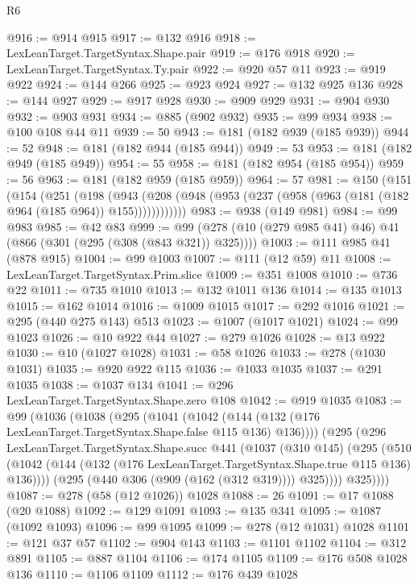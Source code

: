 \begin{lexlean}{R6}
\begin{coremodule}
{{{{{{{{{{{{{{{{{{{{{{{{{{{{{{{{{{{{{{{{{{{{{{{{{{@916 := @914 @915
@917 := @132 @916
@918 := LexLeanTarget.TargetSyntax.Shape.pair
@919 := @176 @918
@920 := LexLeanTarget.TargetSyntax.Ty.pair
@922 := @920 @57 @11
@923 := @919 @922
@924 := @144 @266
@925 := @923 @924
@927 := @132 @925 @136
@928 := @144 @927
@929 := @917 @928
@930 := @909 @929
@931 := @904 @930
@932 := @903 @931
@934 := @885 (@902 @932)
@935 := @99 @934
@938 := @100 @108 @44 @11
@939 := 50
@943 := @181 (@182 @939 (@185 @939))
@944 := 52
@948 := @181 (@182 @944 (@185 @944))
@949 := 53
@953 := @181 (@182 @949 (@185 @949))
@954 := 55
@958 := @181 (@182 @954 (@185 @954))
@959 := 56
@963 := @181 (@182 @959 (@185 @959))
@964 := 57
@981 := @150
    (@151
      (@154
        (@251
          (@198
            (@943 (@208 (@948 (@953 (@237 (@958 (@963 (@181 (@182 @964 (@185 @964)) @155))))))))))))
@983 := @938 (@149 @981)
@984 := @99 @983
@985 := @42 @83
@999 := @99 (@278 (@10 (@279 @985 @41) @46) @41 (@866 (@301 (@295 (@308 (@843 @321)) @325))))
@1003 := @111 @985 @41 (@878 @915)
@1004 := @99 @1003
@1007 := @111 (@12 @59) @11
@1008 := LexLeanTarget.TargetSyntax.Prim.slice
@1009 := @351 @1008
@1010 := @736 @22
@1011 := @735 @1010
@1013 := @132 @1011 @136
@1014 := @135 @1013
@1015 := @162 @1014
@1016 := @1009 @1015
@1017 := @292 @1016
@1021 := @295 (@440 @275 @143) @513
@1023 := @1007 (@1017 @1021)
@1024 := @99 @1023
@1026 := @10 @922 @44
@1027 := @279 @1026
@1028 := @13 @922
@1030 := @10 (@1027 @1028)
@1031 := @58 @1026
@1033 := @278 (@1030 @1031)
@1035 := @920 @922 @115
@1036 := @1033 @1035
@1037 := @291 @1035
@1038 := @1037 @134
@1041 := @296 LexLeanTarget.TargetSyntax.Shape.zero @108
@1042 := @919 @1035
@1083 := @99
    (@1036
      (@1038
        (@295
          (@1041 (@1042 (@144 (@132 (@176 LexLeanTarget.TargetSyntax.Shape.false @115 @136) @136))))
          (@295
            (@296
              LexLeanTarget.TargetSyntax.Shape.succ
              @441
              (@1037
                (@310 @145)
                (@295
                  (@510
                    (@1042
                      (@144 (@132 (@176 LexLeanTarget.TargetSyntax.Shape.true @115 @136) @136))))
                  (@295 (@440 @306 (@909 (@162 (@312 @319)))) @325))))
            @325))))
@1087 := @278 (@58 (@12 @1026)) @1028
@1088 := 26
@1091 := @17 @1088 (@20 @1088)
@1092 := @129 @1091
@1093 := @135 @341
@1095 := @1087 (@1092 @1093)
@1096 := @99 @1095
@1099 := @278 (@12 @1031) @1028
@1101 := @121 @37 @57
@1102 := @904 @143
@1103 := @1101 @1102
@1104 := @312 @891
@1105 := @887 @1104
@1106 := @174 @1105
@1109 := @176 @508 @1028 @136
@1110 := @1106 @1109
@1112 := @176 @439 @1028
}}}}}}}}}}}}}}}}}}}}}}}}}}}}}}}}}}}}}}}}}}}}}}}}}}
\end{coremodule}
\end{lexlean}
